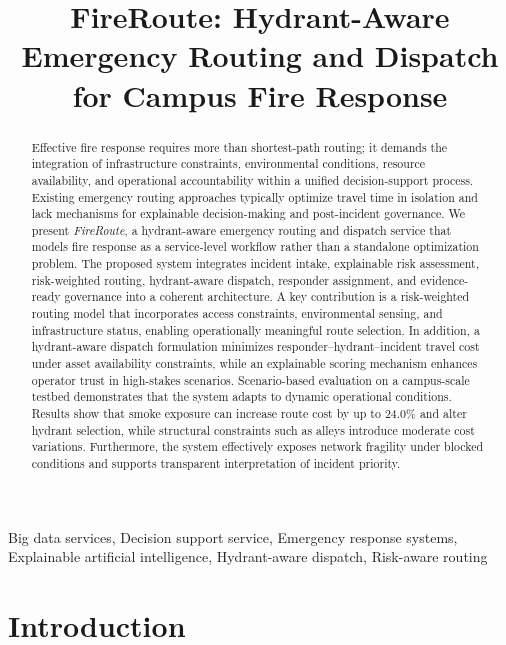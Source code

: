 \documentclass[conference]{IEEEtran}
\title{FireRoute: Hydrant-Aware Emergency Routing and Dispatch for Campus Fire Response}
\author{
\IEEEauthorblockN{
Kittisak Srimek\IEEEauthorrefmark{1}, and
Kundjanasith Thonglek\IEEEauthorrefmark{1}}
\IEEEauthorblockA{\IEEEauthorrefmark{1}Department of Computer Engineering, Faculty of Engineering, Kasetsart University,
Bangkok, Thailand \\ Email: \{kittisak.srime,kundjanasith.th\}@ku.th}}
\begin{document}
\maketitle


\begin{abstract}
Effective fire response requires more than shortest-path routing; it demands the integration of infrastructure constraints, environmental conditions, resource availability, and operational accountability within a unified decision-support process. Existing emergency routing approaches typically optimize travel time in isolation and lack mechanisms for explainable decision-making and post-incident governance. We present \textit{FireRoute}, a hydrant-aware emergency routing and dispatch service that models fire response as a service-level workflow rather than a standalone optimization problem. The proposed system integrates incident intake, explainable risk assessment, risk-weighted routing, hydrant-aware dispatch, responder assignment, and evidence-ready governance into a coherent architecture. A key contribution is a risk-weighted routing model that incorporates access constraints, environmental sensing, and infrastructure status, enabling operationally meaningful route selection. In addition, a hydrant-aware dispatch formulation minimizes responder--hydrant--incident travel cost under asset availability constraints, while an explainable scoring mechanism enhances operator trust in high-stakes scenarios. Scenario-based evaluation on a campus-scale testbed demonstrates that the system adapts to dynamic operational conditions. Results show that smoke exposure can increase route cost by up to 24.0\% and alter hydrant selection, while structural constraints such as alleys introduce moderate cost variations. Furthermore, the system effectively exposes network fragility under blocked conditions and supports transparent interpretation of incident priority.


\end{abstract}


\begin{IEEEkeywords}
Big data services, Decision support service, Emergency response systems,  Explainable artificial intelligence, Hydrant-aware dispatch,  Risk-aware routing
\end{IEEEkeywords}

\section{Introduction}~\label{sec:introduction}

\end{document}
